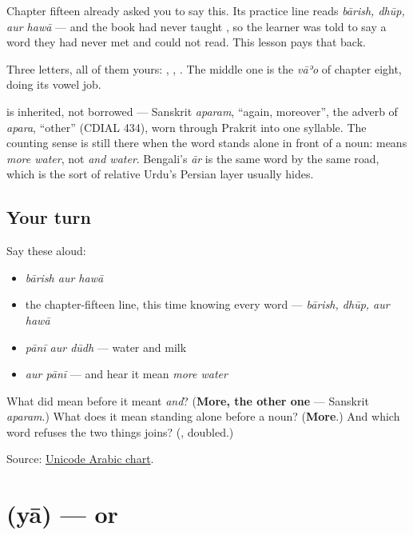 Chapter fifteen already asked you to say this. Its practice line reads \emph{bārish, dhūp, aur hawā} — and the book had never taught \textbf{}, so the learner was told to say a word they had never met and could not read. This lesson pays that back.

Three letters, all of them yours: \textbf{}, \textbf{}, \textbf{}. The middle one is the \emph{vāʾo} of chapter eight, doing its vowel job.

\begin{cousinweb}
\textbf{} is inherited, not borrowed — Sanskrit \emph{aparam}, \textquotedblleft{}again, moreover\textquotedblright{}, the adverb of \emph{apara}, \textquotedblleft{}other\textquotedblright{} (CDIAL 434), worn through Prakrit into one syllable. The counting sense is still there when the word stands alone in front of a noun: \textbf{ } means \emph{more water}, not \emph{and water}. Bengali's \emph{ār} is the same word by the same road, which is the sort of relative Urdu's Persian layer usually hides.
\end{cousinweb}

\subsection*{Your turn}
Say these aloud:

\begin{itemize}
\raggedright
  \item \emph{bārish aur hawā}
  \item the chapter-fifteen line, this time knowing every word — \emph{bārish, dhūp, aur hawā}
  \item \emph{pānī aur dūdh} — water and milk
  \item \emph{aur pānī} — and hear it mean \emph{more water}
\end{itemize}

\begin{tcolorbox}[breakable,colback=teal!4,colframe=teal!35!black,title={Before you move on}]
What did \textbf{} mean before it meant \emph{and}? (\textbf{More, the other one} — Sanskrit \emph{aparam}.) What does it mean standing alone before a noun? (\textbf{More}.) And which word refuses the two things \textbf{} joins? (\textbf{}, doubled.)

Source: \href{https://www.unicode.org/charts/PDF/U0600.pdf}{Unicode Arabic chart}.
\end{tcolorbox}
\section[\texorpdfstring{\ur{یا} (yā)}{یا (yā)}]{ (yā) — or}

